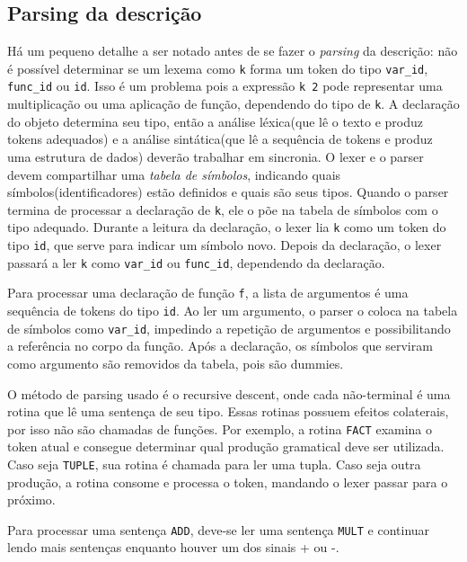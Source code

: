 \documentclass[10pt,a4paper,final]{article}
\begin{document}
\newpage


\subsection{Parsing da descrição}
Há um pequeno detalhe a ser notado antes de se fazer o \textit{parsing} da descrição: não é possível determinar se um lexema como \texttt{k} forma um token do tipo \texttt{var\_id}, \texttt{func\_id} ou \texttt{id}. Isso é um problema pois a expressão \texttt{k 2} pode representar uma multiplicação ou uma aplicação de função, dependendo do tipo de \texttt{k}. A declaração do objeto determina seu tipo, então a análise léxica(que lê o texto e produz tokens adequados) e a análise sintática(que lê a sequência de tokens e produz uma estrutura de dados) deverão trabalhar em sincronia. O lexer e o parser devem compartilhar uma \textit{tabela de símbolos}, indicando quais símbolos(identificadores) estão definidos e quais são seus tipos. Quando o parser termina de processar a declaração de \texttt{k}, ele o põe na tabela de símbolos com o tipo adequado. Durante a leitura da declaração, o lexer lia \texttt{k} como um token do tipo \texttt{id}, que serve para indicar um símbolo novo. Depois da declaração, o lexer passará a ler \texttt{k} como \texttt{var\_id} ou \texttt{func\_id}, dependendo da declaração.

Para processar uma declaração de função \texttt{f}, a lista de argumentos é uma sequência de tokens do tipo \texttt{id}. Ao ler um argumento, o parser o coloca na tabela de símbolos como \texttt{var\_id}, impedindo a repetição de argumentos e possibilitando a referência no corpo da função. Após a declaração, os símbolos que serviram como argumento são removidos da tabela, pois são dummies.

O método de parsing usado é o recursive descent, onde cada não-terminal é uma rotina que lê uma sentença de seu tipo. Essas rotinas possuem efeitos colaterais, por isso não são chamadas de funções. Por exemplo, a rotina \texttt{FACT} examina o token atual e consegue determinar qual produção gramatical deve ser utilizada. Caso seja \texttt{TUPLE}, sua rotina é chamada para ler uma tupla. Caso seja outra produção, a rotina consome e processa o token, mandando o lexer passar para o próximo.

Para processar uma sentença \texttt{ADD}, deve-se ler uma sentença \texttt{MULT} e continuar lendo mais sentenças enquanto houver um dos sinais + ou -.

\newpage

\end{document}
